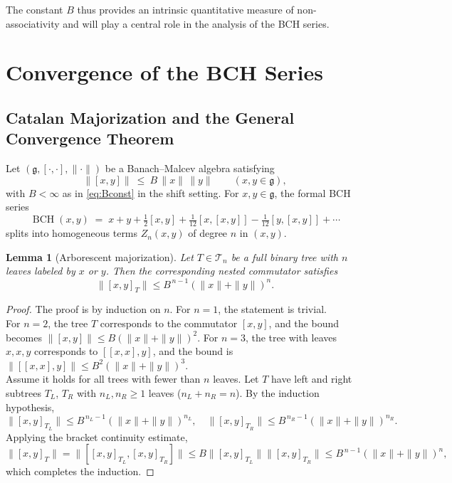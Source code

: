 \documentclass[11pt]{amsart}
\numberwithin{equation}{section}
\newtheorem{lemma}[theorem]{Lemma}
\theoremstyle{remark}
\newcommand{\BCH}{\operatorname{BCH}}
\begin{document}
\smallskip
The constant \(B\) thus provides an intrinsic quantitative measure of non-associativity and will play a central role in the analysis of the BCH series.
\section{Convergence of the BCH Series}\label{sec:convergence}

\subsection{Catalan Majorization and the General Convergence Theorem}

Let $(\mathfrak g,[\cdot,\cdot],\|\cdot\|)$ be a Banach--Malcev algebra satisfying
\begin{equation}\label{eq:boundB}
\|[x,y]\|\ \le\ B\,\|x\|\,\|y\| \qquad (x,y\in\mathfrak g),
\end{equation}
with $B<\infty$ as in \eqref{eq:Bconst} in the shift setting. For $x,y\in\mathfrak g$, the formal BCH series
\[
\BCH(x,y) \;=\; x+y+\tfrac12[x,y]+\tfrac{1}{12}[x,[x,y]]-\tfrac{1}{12}[y,[x,y]]+\cdots
\]
splits into homogeneous terms $Z_n(x,y)$ of degree $n$ in $(x,y)$.

\begin{lemma}[Arborescent majorization]\label{lem:tree-estimate}
Let $T \in \mathcal{T}_n$ be a full binary tree with $n$ leaves labeled by $x$ or $y$. Then the corresponding nested commutator satisfies
\[
\|[x, y]_T\| \leq B^{\,n-1} (\|x\| + \|y\|)^n.
\]
\end{lemma}

\begin{proof}
The proof is by induction on $n$. For $n = 1$, the statement is trivial. \\

For $n=2$, the tree $T$ corresponds to the commutator $[x, y]$, and the bound becomes $\|[x, y]\| \leq B (\|x\| + \|y\|)^2$. For $n=3$, the tree with leaves $x, x, y$ corresponds to $[[x, x], y]$, and the bound is $\|[[x, x], y]\| \leq B^2 (\|x\| + \|y\|)^3$.\\

Assume it holds for all trees with fewer than $n$ leaves. Let $T$ have left and right subtrees $T_L$, $T_R$ with $n_L, n_R \geq 1$ leaves ($n_L + n_R = n$). By the induction hypothesis,
\[
\|[x, y]_{T_L}\| \leq B^{\,n_L - 1} (\|x\| + \|y\|)^{n_L}, \quad
\|[x, y]_{T_R}\| \leq B^{\,n_R - 1} (\|x\| + \|y\|)^{n_R}.
\]
Applying the bracket continuity estimate,
\[
\|[x, y]_T\| = \|[[x, y]_{T_L}, [x, y]_{T_R}]\| \leq B \|[x, y]_{T_L}\| \|[x, y]_{T_R}\|
\leq B^{\,n-1} (\|x\| + \|y\|)^n,
\]
which completes the induction.
\end{proof}
\end{document}
